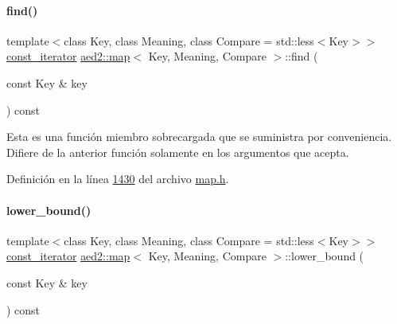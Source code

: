 \mbox{\label{classaed2_1_1map_adbf6f4ce01a16ca506e3c75fc2843882_adbf6f4ce01a16ca506e3c75fc2843882}} 
\paragraph{\texorpdfstring{find()}{find()}\hspace{0.1cm}{\footnotesize\ttfamily [2/2]}}
{\footnotesize\ttfamily template$<$class Key, class Meaning, class Compare = std\+::less$<$\+Key$>$$>$ \\
\hyperlink{classaed2_1_1map_1_1const__iterator}{const\+\_\+iterator} \hyperlink{classaed2_1_1map}{aed2\+::map}$<$ Key, Meaning, Compare $>$\+::find (\begin{DoxyParamCaption}\item[{const Key \&}]{key }\end{DoxyParamCaption}) const\hspace{0.3cm}{\ttfamily [inline]}}

Esta es una función miembro sobrecargada que se suministra por conveniencia. Difiere de la anterior función solamente en los argumentos que acepta. 

Definición en la línea \hyperlink{map_8h_source_l01430}{1430} del archivo \hyperlink{map_8h_source}{map.\+h}.

\mbox{\label{classaed2_1_1map_a62075a47afdf89267c5462f88164af3d_a62075a47afdf89267c5462f88164af3d}} 
\paragraph{\texorpdfstring{lower\+\_\+bound()}{lower\_bound()}\hspace{0.1cm}{\footnotesize\ttfamily [1/2]}}
{\footnotesize\ttfamily template$<$class Key, class Meaning, class Compare = std\+::less$<$\+Key$>$$>$ \\
\hyperlink{classaed2_1_1map_1_1const__iterator}{const\+\_\+iterator} \hyperlink{classaed2_1_1map}{aed2\+::map}$<$ Key, Meaning, Compare $>$\+::lower\+\_\+bound (\begin{DoxyParamCaption}\item[{const Key \&}]{key }\end{DoxyParamCaption}) const\hspace{0.3cm}{\ttfamily [inline]}}



